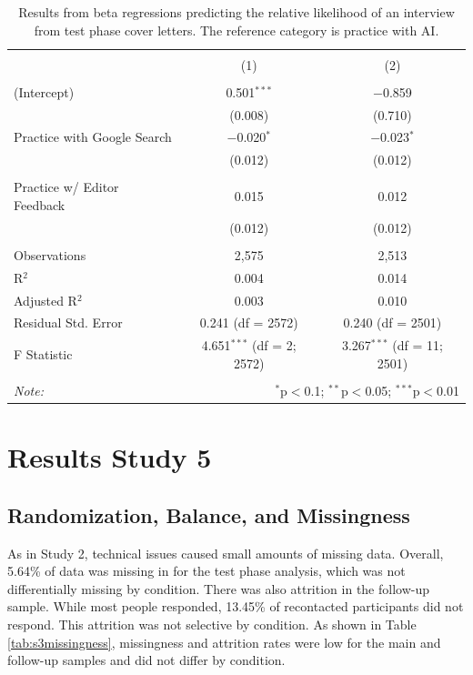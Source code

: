 \documentclass[11pt]{report}
\begin{document}
\begin{append}
\begin{table}[!htbp] \centering 
    \caption{Results from beta regressions predicting the relative likelihood of an interview from test phase cover letters. The reference category is practice with AI.}
  \label{tab:beta4} 
\begin{tabular}{@{\extracolsep{5pt}}lcc} 
\toprule
\\[-1.8ex] & (1) & (2)\\ 
\hline \\[-1.8ex] 
 (Intercept) & 0.501$^{***}$ & $-$0.859 \\ 
  & (0.008) & (0.710) \\ 
 Practice with Google Search & $-$0.020$^{*}$ & $-$0.023$^{*}$ \\ 
  & (0.012) & (0.012) \\ 
  & & \\ 
 Practice w/ Editor Feedback & 0.015 & 0.012 \\ 
  & (0.012) & (0.012) \\ 
\hline \\[-1.8ex] 
Observations & 2,575 & 2,513 \\ 
R$^{2}$ & 0.004 & 0.014 \\ 
Adjusted R$^{2}$ & 0.003 & 0.010 \\ 
Residual Std. Error & 0.241 (df = 2572) & 0.240 (df = 2501) \\ 
F Statistic & 4.651$^{***}$ (df = 2; 2572) & 3.267$^{***}$ (df = 11; 2501) \\ 
\hline 
\hline \\[-1.8ex] 
\textit{Note:}  & \multicolumn{2}{r}{$^{*}$p$<$0.1; $^{**}$p$<$0.05; $^{***}$p$<$0.01} \\ 
\end{tabular} 

\end{table} 


\FloatBarrier
\section{Results Study 5}
\subsection{Randomization, Balance, and Missingness}

As in Study 2, technical issues caused small amounts of missing data. Overall, 5.64\% of data was missing in for the test phase analysis, which was not differentially missing by condition. 
There was also attrition in the follow-up sample. While most people responded, 13.45\% of recontacted participants did not respond. This attrition was not selective by condition. As shown in Table \ref{tab:s3missingness}, missingness and attrition rates were low for the main and follow-up samples and did not differ by condition.



\end{append}
\end{document}
